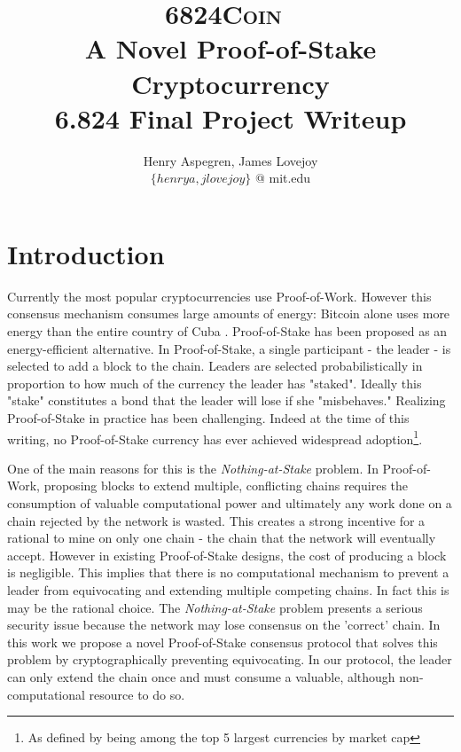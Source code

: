 \documentclass{article}
\newcommand{\coin}{ \textsc{6824Coin}\ }
\begin{document}
\title{%
  \coin \\ 
  A Novel Proof-of-Stake Cryptocurrency\\
  \large 6.824 Final Project Writeup}
\author{Henry Aspegren, James Lovejoy \\ $\{ henrya, jlovejoy \}$ @ mit.edu}
\maketitle

\section{Introduction}

Currently the most popular cryptocurrencies use Proof-of-Work. However this consensus mechanism consumes large amounts of energy: Bitcoin alone uses more energy than the entire country of Cuba \cite{energy}. Proof-of-Stake has been proposed as an energy-efficient alternative. In Proof-of-Stake, a single participant - the leader - is selected to add a block to the chain. Leaders are selected probabilistically in proportion to how much of the currency the leader has "staked". Ideally this "stake" constitutes a bond that the leader will lose if she "misbehaves." Realizing Proof-of-Stake in practice has been challenging. Indeed at the time of this writing, no Proof-of-Stake currency has ever achieved widespread adoption\footnote{As defined by being among the top 5 largest currencies by market cap}. 

One of the main reasons for this is the \textit{Nothing-at-Stake} problem. In Proof-of-Work, proposing blocks to extend multiple, conflicting chains requires the consumption of valuable computational power and ultimately any work done on a chain rejected by the network is wasted. This creates a strong incentive for a rational to mine on only one chain - the chain that the network will eventually accept. However in existing Proof-of-Stake designs, the cost of producing a block is negligible. This implies that there is no computational mechanism to prevent a leader from equivocating and extending multiple competing chains. In fact this is may be the rational choice. The \textit{Nothing-at-Stake} problem presents a serious security issue because the network may lose consensus on the 'correct' chain. In this work we propose a novel Proof-of-Stake consensus protocol that solves this problem by cryptographically preventing equivocating. In our protocol, the leader can only extend the chain once and must consume a valuable, although non-computational resource to do so.
\end{document}
